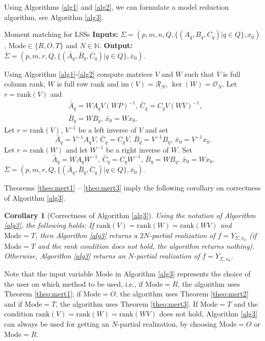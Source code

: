 \documentclass[journal]{IEEEtran}
\newcommand{\IM}{\mathrm{im}}
\newcommand{\Rank}{\mathrm{rank}}
\newtheorem{Corollary}{Corollary}
\begin{document}
Using Algorithms \ref{alg1} and \ref{alg2}, we can formulate a model reduction algorithm, see Algorithm \ref{alg3}.
\begin{algorithm}
	\caption{Moment matching for LSSs
		\newpage 
		\textbf{Inputs:} $\Sigma=(p,m,n,Q,\{(A_q,B_q,C_q)|q \in Q\},x_0)$, $\mathrm{Mode} \in \{ R,O,T \}$ and $N \in \mathbb{N}$.
		\newpage  
		\textbf{Output: } $\bar{\Sigma}=(p,m,r,Q,\{(\bar{A}_q,\bar{B}_q,\bar{C}_q)|q \in Q\},\bar{x}_0)$.
	}
	\label{alg3}
	\begin{algorithmic}
		\STATE Using Algorithm \ref{alg1}-\ref{alg2} compute matrices $V$ and $W$ such that
		$V$ is full column rank, $W$ is full row rank and $\IM (V)= \mathscr{R}_N$,
		$\ker (W) = \mathscr{O}_N$.
		\IF{$\Rank (V)=\Rank (W)=\Rank (WV)$ and $\mathrm{Mode}=T$} 
		\STATE
		Let $r=\Rank (V)$ and
		\begin{align*}
			& \bar{A}_q=WA_qV(WP)^{-1} \mbox{, } \bar{C}_q=C_qV(WV)^{-1} \mbox{, } \\
			& \bar{B}_q=WB_q \mbox{, } \bar{x}_0=Wx_0. 
		\end{align*}
		\ENDIF
\STATE
		Let $r=\Rank (V)$, $V^{-1}$ be a left inverse of $V$ and set
		\[
		\bar{A}_q=V^{-1}A_qV \mbox{, } \bar{C}_q=C_qV \mbox{, } \bar{B}_q=V^{-1}B_q \mbox{, } \bar{x}_0=V^{-1}x_0.
		\]
		\ENDIF
		\STATE
		Let $r=\Rank (W)$ and let $W^{-1}$ be a right inverse of $W$. Set
		\[
		\bar{A}_q=WA_qW^{-1} \mbox{, } \bar{C}_q=C_qW^{-1} \mbox{, } \bar{B}_q=WB_q \mbox{, } \bar{x}_0=Wx_0.
		\]
		\ENDIF
		\RETURN $\bar{\Sigma}=(p,m,r,Q,\{(\bar{A}_q,\bar{B}_q,\bar{C}_q)|q \in Q\},\bar{x}_0)$.
	\end{algorithmic}
\end{algorithm}


Theorems \ref{theo:mert1} -- \ref{theo:mert3} imply the following corollary on correctness of Algorithm \ref{alg3}.

\begin{Corollary}[Correctness of Algorithm \ref{alg3}]
	Using the notation of Algorithm \ref{alg3}, the following holds: If $\Rank (V)=\Rank (W) = \Rank (WV)$ and $\mathrm{Mode}=T$, then Algorithm \ref{alg3} returns a $2N$-partial realization of $f=Y_{\Sigma,x_0}$ (if $\mathrm{Mode}=T$ and the rank condition does not hold, the algorithm returns nothing). Otherwise, Algorithm \ref{alg3} returns an $N$-partial realization of $f=Y_{\Sigma,x_0}$.
\end{Corollary}

Note that the input variable $\mathrm{Mode}$ in Algorithm \ref{alg3} represents the choice of the user on which method to be used, i.e., if $\mathrm{Mode}=R$, the algorithm uses Theorem \ref{theo:mert1}; if $\mathrm{Mode}=O$, the algorithm uses Theorem \ref{theo:mert2} and if $\mathrm{Mode}=T$, the algorithm uses Theorem \ref{theo:mert3}. If $\mathrm{Mode}=T$ and the condition $\Rank (V)=\Rank (W)=\Rank (WV)$ does not hold, Algorithm \ref{alg3} can always be used for getting an $N$-partial realization, by choosing $\mathrm{Mode}=O$ or  $\mathrm{Mode}=R$.
\end{document}
